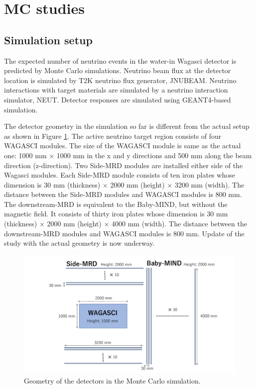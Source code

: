 \section{MC studies}
\label{sec:mc_study}
\subsection{Simulation setup}
\label{sec:mc_setup}
The expected number of neutrino events in the water-in Wagasci detector
is predicted by Monte Carlo simulations.
Neutrino beam flux at the detector location is simulated by T2K neutrino flux generator, JNUBEAM. Neutrino interactions with target materials are simulated by a neutrino interaction simulator, NEUT. Detector responses are simulated using GEANT4-based simulation.


The detector geometry in the simulation so far is different from the actual setup as shown in Figure \ref{fig:wagasci_mc_geometry}.
The active neutrino target region consists of four WAGASCI modules.
The size of the WAGASCI module is same as the actual one: 1000 mm $\times$ 1000 mm in the x and y directions and 500 mm along the beam direction (z-direction).
Two Side-MRD modules are installed either side of the Wagasci modules.
Each Side-MRD module consists of ten iron plates whose dimension is 30 mm (thickness) $\times$ 2000 mm (height) $\times$ 3200 mm (width). 
The distance between the Side-MRD modules and WAGASCI modules is 800 mm.
The downstream-MRD is equivalent to the Baby-MIND, but without the magnetic field.
It consists of thirty iron plates whose dimension is  30 mm (thickness) $\times$ 2000 mm (height) $\times$ 4000 mm (width).
The distance between the downstream-MRD modules and WAGASCI modules is 800 mm.
Update of the study with the actual geometry is now underway.

\begin{figure}[tbhp]
\begin{center}
\includegraphics[width=0.8\linewidth]{fig/wagasci_mc_geometry.pdf}
\end{center}
\caption{
Geometry of the detectors in the Monte Carlo simulation.}
\label{fig:wagasci_mc_geometry}
\end{figure}

